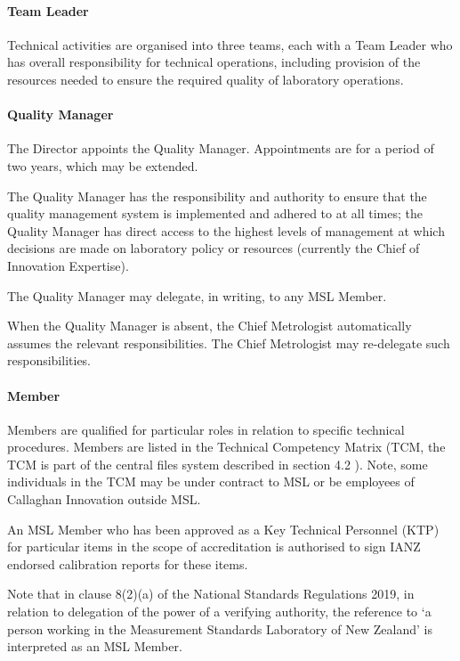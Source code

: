 \paragraph{Team Leader}
Technical activities are organised into three teams, each with a Team Leader who has overall responsibility for technical operations, including provision of the resources needed to ensure the required quality of laboratory operations. 
\paragraph{Quality Manager}
The Director appoints the Quality Manager. Appointments are for a period of two years, which may be extended. 

The Quality Manager has the responsibility and authority to ensure that the quality management system is implemented and adhered to at all times; the Quality Manager has direct access to the highest levels of management at which decisions are made on laboratory policy or resources (currently the Chief of Innovation Expertise).

The Quality Manager may delegate, in writing, to any MSL Member.

When the Quality Manager is absent, the Chief Metrologist automatically assumes the relevant responsibilities.  The Chief Metrologist may re-delegate such responsibilities. 
%
\paragraph{Member}
Members are qualified for particular roles in relation to specific technical procedures. Members are listed in the Technical Competency Matrix (TCM, the TCM is part of the central files system described in section 4.2 ). Note, some individuals in the TCM may be under contract to MSL or be employees of Callaghan Innovation outside MSL. 

An MSL Member who has been approved as a Key Technical Personnel (KTP) for particular items in the scope of accreditation is authorised to sign IANZ endorsed calibration reports for these items.


{Note that in clause 8(2)(a) of the National Standards Regulations 2019, in relation to delegation of the power of a verifying authority, the reference to `a person working in the Measurement Standards Laboratory of New Zealand' is interpreted as an MSL Member.}

